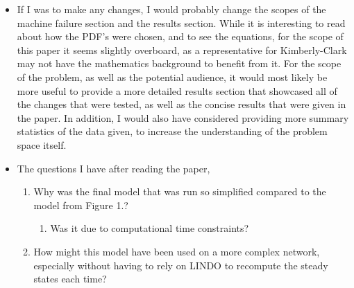 \documentclass[letterpaper,10pt]{article}
\begin{document}
\begin{itemize}
\item If I was to make any changes, I would probably change the scopes of the machine failure section and the results section. While it is interesting to read about how the PDF's were chosen, and to see the equations, for the scope of this paper it seems slightly overboard, as a representative for Kimberly-Clark may not have the mathematics background to benefit from it. For the scope of the problem, as well as the potential audience, it would most likely be more useful to provide a more detailed results section that showcased all of the changes that were tested, as well as the concise results that were given in the paper. In addition, I would also have considered providing more summary statistics of the data given, to increase the understanding of the problem space itself.
\item The questions I have after reading the paper,
\begin{enumerate}
\item Why was the final model that was run so simplified compared to the model from Figure 1.?
\begin{enumerate}
\item Was it due to computational time constraints?
\end{enumerate}
\item How might this model have been used on a more complex network, especially without having to rely on LINDO to recompute the steady states each time?
\end{enumerate}
\end{itemize}
\end{document}
